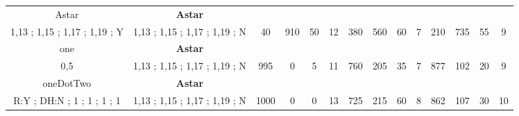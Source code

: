 \begin{table}[]
{\begin{tabular}{|c|c|c|c|c|c|c|c|c|c|c|c|c|c|}
Astar & \cellcolor{blue!15}\textbf{Astar}& {\color[HTML]{00009B} } & {\color[HTML]{9A0000} } & {\color[HTML]{009901} } &  & {\color[HTML]{00009B} } & {\color[HTML]{9A0000} } & {\color[HTML]{009901} } &  & {\color[HTML]{00009B} } & {\color[HTML]{9A0000} } & {\color[HTML]{009901} } &  \\ 
1,13 ; 1,15 ; 1,17 ; 1,19 ; Y & \cellcolor{ blue!15}1,13 ; 1,15 ; 1,17 ; 1,19 ; N & \multirow{-2}{*}{{\color[HTML]{00009B} 40}} & \multirow{-2}{*}{{\color[HTML]{9A0000} 910}} & \multirow{-2}{*}{{\color[HTML]{009901} 50}} & \multirow{-2}{*}{12} & \multirow{-2}{*}{{\color[HTML]{00009B} 380}} & \multirow{-2}{*}{{\color[HTML]{9A0000} 560}} & \multirow{-2}{*}{{\color[HTML]{009901} 60}} & \multirow{-2}{*}{7} & \multirow{-2}{*}{{\color[HTML]{00009B} 210}} & \multirow{-2}{*}{{\color[HTML]{9A0000} 735}} & \multirow{-2}{*}{{\color[HTML]{009901} 55}} & \multirow{-2}{*}{9} \\ \hline

one & \cellcolor{blue!15}\textbf{Astar}& {\color[HTML]{00009B} } & {\color[HTML]{9A0000} } & {\color[HTML]{009901} } &  & {\color[HTML]{00009B} } & {\color[HTML]{9A0000} } & {\color[HTML]{009901} } &  & {\color[HTML]{00009B} } & {\color[HTML]{9A0000} } & {\color[HTML]{009901} } &  \\ 
0,5 & \cellcolor{ blue!15}1,13 ; 1,15 ; 1,17 ; 1,19 ; N & \multirow{-2}{*}{{\color[HTML]{00009B} 995}} & \multirow{-2}{*}{{\color[HTML]{9A0000} 0}} & \multirow{-2}{*}{{\color[HTML]{009901} 5}} & \multirow{-2}{*}{11} & \multirow{-2}{*}{{\color[HTML]{00009B} 760}} & \multirow{-2}{*}{{\color[HTML]{9A0000} 205}} & \multirow{-2}{*}{{\color[HTML]{009901} 35}} & \multirow{-2}{*}{7} & \multirow{-2}{*}{{\color[HTML]{00009B} 877}} & \multirow{-2}{*}{{\color[HTML]{9A0000} 102}} & \multirow{-2}{*}{{\color[HTML]{009901} 20}} & \multirow{-2}{*}{9} \\ \hline

oneDotTwo & \cellcolor{blue!15}\textbf{Astar}& {\color[HTML]{00009B} } & {\color[HTML]{9A0000} } & {\color[HTML]{009901} } &  & {\color[HTML]{00009B} } & {\color[HTML]{9A0000} } & {\color[HTML]{009901} } &  & {\color[HTML]{00009B} } & {\color[HTML]{9A0000} } & {\color[HTML]{009901} } &  \\ 
R:Y ; DH:N ; 1 ; 1 ; 1 ; 1 & \cellcolor{ blue!15}1,13 ; 1,15 ; 1,17 ; 1,19 ; N & \multirow{-2}{*}{{\color[HTML]{00009B} 1000}} & \multirow{-2}{*}{{\color[HTML]{9A0000} 0}} & \multirow{-2}{*}{{\color[HTML]{009901} 0}} & \multirow{-2}{*}{13} & \multirow{-2}{*}{{\color[HTML]{00009B} 725}} & \multirow{-2}{*}{{\color[HTML]{9A0000} 215}} & \multirow{-2}{*}{{\color[HTML]{009901} 60}} & \multirow{-2}{*}{8} & \multirow{-2}{*}{{\color[HTML]{00009B} 862}} & \multirow{-2}{*}{{\color[HTML]{9A0000} 107}} & \multirow{-2}{*}{{\color[HTML]{009901} 30}} & \multirow{-2}{*}{10} \\ \hline


\end{tabular}}
\end{table}
